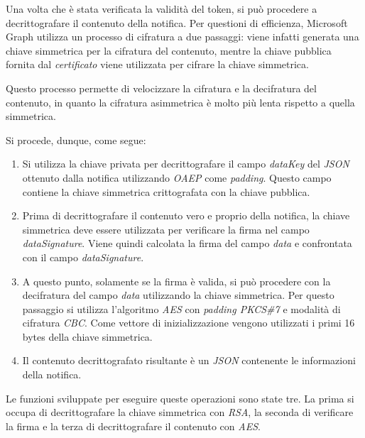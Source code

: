 \bigskip

Una volta che è stata verificata la validità del token, si può procedere a decrittografare il contenuto della notifica.
Per questioni di efficienza, Microsoft Graph utilizza un processo di cifratura a due passaggi: viene infatti generata una chiave simmetrica per la cifratura del contenuto, mentre la chiave pubblica fornita dal \emph{certificato} viene utilizzata per cifrare la chiave simmetrica.

Questo processo permette di velocizzare la cifratura e la decifratura del contenuto, in quanto la cifratura asimmetrica è molto più lenta rispetto a quella simmetrica.

\noindent Si procede, dunque, come segue:
\begin{enumerate}
	\item Si utilizza la chiave privata per decrittografare il campo \emph{dataKey} del \emph{JSON} ottenuto dalla notifica utilizzando \emph{\gls{OAEP}} come \emph{padding}. Questo campo contiene la chiave simmetrica crittografata con la chiave pubblica.
	\item Prima di decrittografare il contenuto vero e proprio della notifica, la chiave simmetrica deve essere utilizzata per verificare la firma nel campo \emph{dataSignature}.
	Viene quindi calcolata la firma del campo \emph{data} e confrontata con il campo \emph{dataSignature}.
	\item A questo punto, solamente se la firma è valida, si può procedere con la decifratura del campo \emph{data} utilizzando la chiave simmetrica.
	Per questo passaggio si utilizza l'algoritmo \emph{AES} con \emph{padding PKCS\#7} e modalità di cifratura \emph{\gls{CBC}}. Come vettore di inizializzazione vengono utilizzati i primi 16 bytes della chiave simmetrica. 
	\item Il contenuto decrittografato risultante è un \emph{JSON} contenente le informazioni della notifica.
\end{enumerate}

\noindent Le funzioni sviluppate per eseguire queste operazioni sono state tre. La prima si occupa di decrittografare la chiave simmetrica con \emph{RSA}, la seconda di verificare la firma e la terza di decrittografare il contenuto con \emph{AES}.

